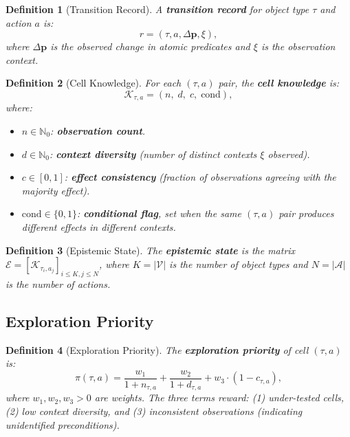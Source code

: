 \documentclass{article}
\newtheorem{definition}{Definition}
\newcommand{\calA}{\mathcal{A}}
\newcommand{\calE}{\mathcal{E}}
\newcommand{\calK}{\mathcal{K}}
\newcommand{\calV}{\mathcal{V}}
\newcommand{\bbN}{\mathbb{N}}
\begin{document}
\begin{definition}[Transition Record]
\label{def:transition_record}
A \textbf{transition record} for object type $\tau$ and action $a$ is:
\begin{equation}
    r = (\tau, a, \Delta\mathbf{p}, \xi),
\end{equation}
where $\Delta\mathbf{p}$ is the observed change in atomic predicates and
$\xi$ is the observation context.
\end{definition}

\begin{definition}[Cell Knowledge]
\label{def:cell_knowledge}
For each $(\tau, a)$ pair, the \textbf{cell knowledge} is:
\begin{equation}
    \calK_{\tau,a} = (n, \; d, \; c, \; \text{cond}),
\end{equation}
where:
\begin{itemize}[nosep]
    \item $n \in \bbN_0$: \textbf{observation count}.
    \item $d \in \bbN_0$: \textbf{context diversity} (number of distinct
          contexts $\xi$ observed).
    \item $c \in [0, 1]$: \textbf{effect consistency} (fraction of
          observations agreeing with the majority effect).
    \item $\text{cond} \in \{0, 1\}$: \textbf{conditional flag}, set when
          the same $(\tau, a)$ pair produces different effects in different
          contexts.
\end{itemize}
\end{definition}

\begin{definition}[Epistemic State]
\label{def:epistemic_state}
The \textbf{epistemic state} is the matrix
$\calE = [\calK_{\tau_i, a_j}]_{i \leq K, j \leq N}$,
where $K = |\calV|$ is the number of object types and $N = |\calA|$ is the
number of actions.
\end{definition}

\subsection{Exploration Priority}
\label{sec:priority}

\begin{definition}[Exploration Priority]
\label{def:priority}
The \textbf{exploration priority} of cell $(\tau, a)$ is:
\begin{equation}
\label{eq:priority}
    \pi(\tau, a) = \frac{w_1}{1 + n_{\tau,a}}
                 + \frac{w_2}{1 + d_{\tau,a}}
                 + w_3 \cdot (1 - c_{\tau,a}),
\end{equation}
where $w_1, w_2, w_3 > 0$ are weights.  The three terms reward:
(1) under-tested cells, (2) low context diversity, and (3) inconsistent
observations (indicating unidentified preconditions).
\end{definition}
\end{document}
